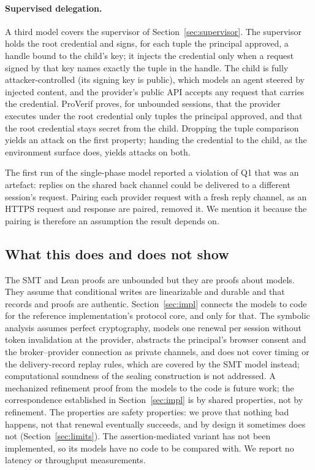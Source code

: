 \documentclass[11pt]{article}
\begin{document}
\paragraph{Supervised delegation.} A third model covers the supervisor of Section~\ref{sec:supervisor}. The supervisor holds the root credential and signs, for each tuple the principal approved, a handle bound to the child's key; it injects the credential only when a request signed by that key names exactly the tuple in the handle. The child is fully attacker-controlled (its signing key is public), which models an agent steered by injected content, and the provider's public API accepts any request that carries the credential. ProVerif proves, for unbounded sessions, that the provider executes under the root credential only tuples the principal approved, and that the root credential stays secret from the child. Dropping the tuple comparison yields an attack on the first property; handing the credential to the child, as the environment surface does, yields attacks on both.

The first run of the single-phase model reported a violation of Q1 that was an artefact: replies on the shared back channel could be delivered to a different session's request. Pairing each provider request with a fresh reply channel, as an HTTPS request and response are paired, removed it. We mention it because the pairing is therefore an assumption the result depends on.

\subsection{What this does and does not show}
\label{sec:evallimits}
The SMT and Lean proofs are unbounded but they are proofs about models. They assume that conditional writes are linearizable and durable and that records and proofs are authentic. Section~\ref{sec:impl} connects the models to code for the reference implementation's protocol core, and only for that. The symbolic analysis assumes perfect cryptography, models one renewal per session without token invalidation at the provider, abstracts the principal's browser consent and the broker--provider connection as private channels, and does not cover timing or the delivery-record replay rules, which are covered by the SMT model instead; computational soundness of the sealing construction is not addressed. A mechanized refinement proof from the models to the code is future work; the correspondence established in Section~\ref{sec:impl} is by shared properties, not by refinement. The properties are safety properties: we prove that nothing bad happens, not that renewal eventually succeeds, and by design it sometimes does not (Section~\ref{sec:limits}). The assertion-mediated variant has not been implemented, so its models have no code to be compared with. We report no latency or throughput measurements.
\end{document}
